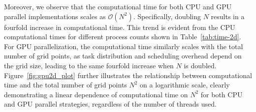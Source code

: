 \documentclass[fleqn,11pt]{elsarticle}
\numberwithin{equation}{section}
\begin{document}
\begin{table}[H]
	\caption{Computational times and speed-ups of the DP-AVF2 schemes on CPU and GPU with varying numbers of threads and spatial discretizations for the 2D KGS equations.}\label{tab:time-2d}
	\centering
\end{table}



Moreover, we observe that the computational time for both CPU and GPU parallel implementations scales as $\mathcal{O}(N^2)$. Specifically, doubling $N$ results in a fourfold increase in computational time. This trend is evident from the CPU computational times for different process counts shown in Table~\ref{tab:time-2d}. For GPU parallelization, the computational time similarly scales with the total number of grid points, as task distribution and scheduling overhead depend on the grid size, leading to the same fourfold increase when $N$ is doubled. Figure~\ref{fig:gpu2d_plot} further illustrates the relationship between computational time and the total number of grid points $N^2$ on a logarithmic scale, clearly demonstrating a linear dependence of computational time on $N^2$ for both CPU and GPU parallel strategies, regardless of the number of threads used.
\end{document}
